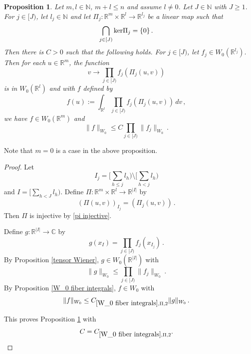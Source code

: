 \documentclass[12pt,reqno]{amsart}
\theoremstyle{plain}
\newtheorem{proposition}[theorem]{Proposition}
\numberwithin{equation}{section}
\theoremstyle{remark}
\newcommand{\uses}[1]{}
\newcommand{\usesdefs}[1]{}
\newcommand{\R}{{\mathbb R}}
\newcommand{\N}{{\mathbb N}}
\newcommand{\C}{{\mathbb C}}
\begin{document}
\begin{proposition}\label{W_0 Brascamp Lieb}\uses{tensor Wiener,W_0 fiber integrals}\usesdefs{auto:Wiener-space-definition}
 Let  $m,l\in\N$, $m+l\le n$ and assume $l\neq 0$.
Let $J\in \N$ with $J\ge 1$. For $j\in [J)$, let $l_j\in \N$ and let  $\Pi_j:\R^m\times \R^l \to \R^{l_j}$
be a linear map such that
\begin{equation}\label{pi injective}
    \bigcap_{j\in [J)} {\rm ker}\Pi_j=\{0\}\, .
\end{equation}
Then there is $C>0$ such that the following holds.
For $j\in [J)$, let $f_j\in W_0(\R^{l_j})$. Then for each
 $u\in \R^m$, the function
 \begin{equation}\label{auto:Wiener-Brascamp-Lieb-fiber-integrand}
     v\to \prod_{j\in [J)}f_j(\Pi_{j}(u,v))
 \end{equation}
 is in $W_0(\R^l)$ and with $f$ defined by
    \begin{equation}\label{auto:Wiener-Brascamp-Lieb-integral}
        f(u):=\int_{\R^l}\prod_{j\in [J)}f_j(\Pi_{j}(u,v))\, dv \, ,
    \end{equation}
    we have $f\in W_0(\R^{m})$ and
    \begin{equation}\label{auto:Wiener-Brascamp-Lieb-bound}
        \|f\|_{W_0}\le C\prod_{j\in[J)}\|f_j\|_{W_0}\, .
    \end{equation}
\end{proposition}
Note that $m=0$ is a case in the above proposition.
\begin{proof}
Let
\begin{equation}
    I_j=[\sum_{h\le j}l_h)\setminus [\sum_{h<j}l_h)
\end{equation}
and $I=[\sum_{h<J} l_h)$.
Define
$\Pi:\R^{m}\times \R^l\to \R^{|I|}$ by
\begin{equation}
    (\Pi(u,v))_{I_j}=(\Pi_{j}(u,v))\, .
\end{equation}
Then $\Pi$ is injective by \eqref{pi injective}.

Define $g:\R^{|I|}\to \C$ by
\begin{equation}
    g(x_I)=\prod_{j\in [J)}f_j(x_{I_j})\, .
\end{equation}
By Proposition \ref{tensor Wiener}, $g\in W_0(\R^{|I|})$ with
\begin{equation}
    \|g\|_{W_0}\le \prod_{j\in[J)}\|f_j\|_{W_0}\ .
\end{equation}
By Proposition \ref{W_0 fiber integrals}, $f\in W_0$ with
\begin{equation}
    \|f\|_{W_0}\le C_{\ref{W_0 fiber integrals},\Pi,2}\|g\|_{W_0}\, .
\end{equation}

This proves Proposition \ref{W_0 Brascamp Lieb} with
\[
C=C_{\ref{W_0 fiber integrals},\Pi,2}.
\]
\end{proof}
\end{document}
